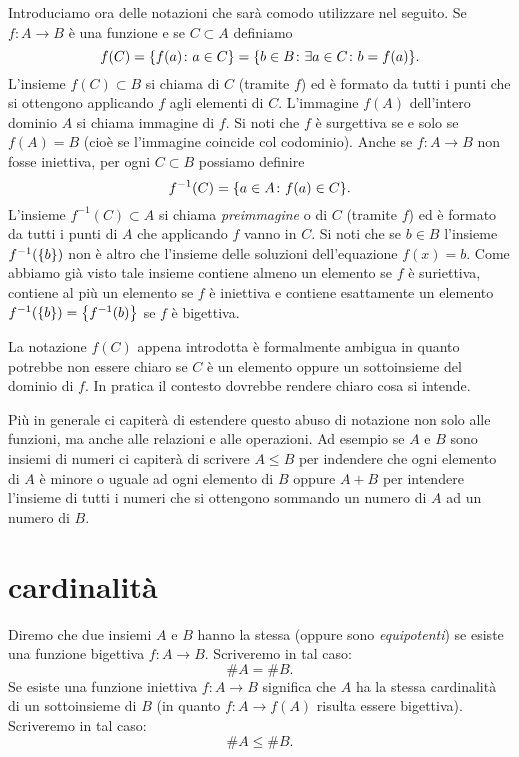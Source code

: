 Introduciamo ora delle notazioni che sarà comodo utilizzare nel seguito.
Se $f\colon A \to B$ è una funzione e se $C\subset A$ definiamo
\[
  f(C) = {\left\{ f(a)\colon a \in C \right\}} = {\left\{ b\in B\colon \exists a\in C\colon b=f(a) \right\}}.
\]
L'insieme $f(C)\subset B$ si chiama 
%
di $C$ (tramite $f$) ed è formato
da tutti i punti che si ottengono applicando $f$ agli elementi di $C$.
L'immagine $f(A)$ dell'intero dominio $A$ si chiama immagine di $f$.
Si noti che $f$ è surgettiva se e solo se $f(A)=B$ (cioè se l'immagine coincide
col codominio).
Anche se $f\colon A \to B$ non fosse iniettiva,
per ogni $C\subset B$ possiamo definire
\[
  f^{-1}(C) = {\left\{ a\in A\colon f(a) \in C \right\}}.
\]
L'insieme $f^{-1}(C)\subset A$ si chiama \emph{preimmagine}
o 
%
di $C$ (tramite $f$)
ed è formato da tutti i punti di $A$ che applicando $f$ vanno in $C$.
Si noti che se $b\in B$ l'insieme $f^{-1}({\left\{ b \right\}})$ non è altro che
l'insieme delle soluzioni dell'equazione $f(x)=b$. Come abbiamo
già visto tale insieme contiene almeno un elemento se $f$ è suriettiva,
contiene al più un elemento se $f$ è iniettiva e contiene esattamente
un elemento $f^{-1}({\left\{ b \right\}}) = {\left\{ f^{-1}(b) \right\}}$ se $f$ è bigettiva.

La notazione $f(C)$ appena introdotta è formalmente ambigua in quanto
potrebbe non essere chiaro se $C$ è un elemento oppure un sottoinsieme
del dominio di $f$.
In pratica il contesto dovrebbe rendere chiaro cosa si intende.

Più in generale ci capiterà di estendere questo abuso di notazione non solo
alle funzioni, ma anche alle relazioni e alle operazioni.
Ad esempio se $A$ e $B$ sono insiemi di numeri ci capiterà di scrivere $A\le B$
per indendere che ogni elemento di $A$ è minore o uguale ad ogni elemento di $B$
oppure $A+B$ per intendere l'insieme di tutti i numeri che si ottengono sommando
un numero di $A$ ad un numero di $B$.

\section{cardinalità}

\begin{definition}[cardinalità]
  Diremo che due insiemi $A$ e $B$ hanno la stessa  
  (oppure sono \emph{equipotenti}) 
  se esiste una funzione bigettiva $f\colon A \to B$.
  Scriveremo in tal caso:
  \[
    \# A = \# B.  
  \] 
  Se esiste una funzione iniettiva $f\colon A\to B$ significa che 
  $A$ ha la stessa cardinalità di un sottoinsieme di $B$ (in quanto $f\colon A \to f(A)$
  risulta essere bigettiva). Scriveremo in tal caso:
  \[
    \# A \le \#B.
  \]
\end{definition}


